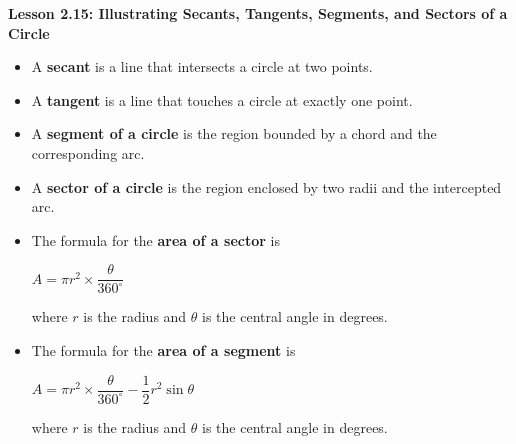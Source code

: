 \begin{center}
\textbf{Lesson 2.15: Illustrating Secants, Tangents, Segments, and Sectors of a Circle}
\end{center}

\vspace*{-1.5ex}

\begin{itemize}
    \item A \textbf{secant} is a line that intersects a circle at two points.
    \item A \textbf{tangent} is a line that touches a circle at exactly one point.
    \item A \textbf{segment of a circle} is the region bounded by a chord and the corresponding arc.
    \item A \textbf{sector of a circle} is the region enclosed by two radii and the intercepted arc.
    \item The formula for the \textbf{area of a sector} is 

{\centering $
    A = \pi r^2 \times \dfrac{\theta}{360^\circ}
$\par}
    where $r$ is the radius and $\theta$ is the central angle in degrees.
    \item The formula for the \textbf{area of a segment} is 

{\centering $
    A = \pi r^2 \times \dfrac{\theta}{360^\circ} - \dfrac{1}{2} r^2 \sin\theta
$\par}
    where $r$ is the radius and $\theta$ is the central angle in degrees.
\end{itemize}

